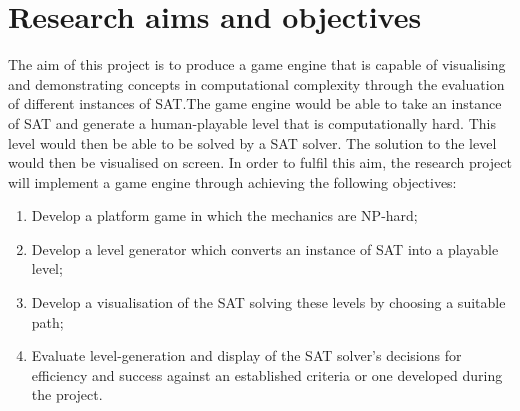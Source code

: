 \documentclass[11pt, a4paper, oneside]{report} %
\begin{document}
\section{Research aims and objectives}


The aim of this project is to produce a game engine that is capable of
visualising and demonstrating concepts in computational complexity through the
evaluation of different instances of SAT.\@ The game engine would be able to
take an instance of SAT and generate a human-playable level that is
computationally hard. This level would then be able to be solved by a SAT
solver. The solution to the level would then be visualised on screen. In order
to fulfil this aim, the research project will implement a game engine through
achieving the following objectives: \\ 

\begin{enumerate}

  \item Develop a platform game in which the mechanics are NP-hard;
  \item Develop a level generator which converts an instance of SAT into a playable level;
  \item Develop a visualisation of the SAT solving these levels by choosing a suitable path;
  \item Evaluate level-generation and display of the SAT solver's decisions for
        efficiency and success against an established criteria or one developed
        during the project.

\end{enumerate}
\end{document}
